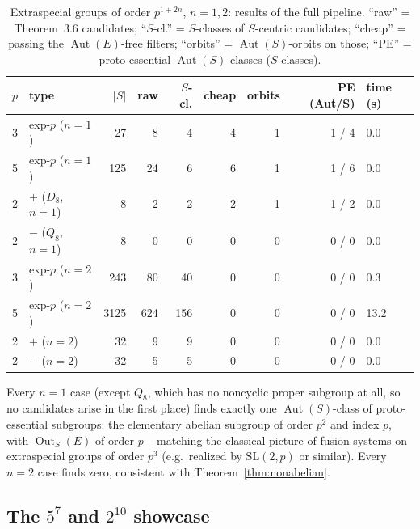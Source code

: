 \documentclass[11pt]{article}
\theoremstyle{remark}
\begin{document}
\begin{table}[htbp]
\centering
\caption{Extraspecial groups of order $p^{1+2n}$, $n=1,2$: results of the
full pipeline. ``raw'' = Theorem~3.6 candidates; ``$S$-cl.'' = $S$-classes
of $S$-centric candidates; ``cheap'' = passing the $\operatorname{Aut}(E)$-free
filters; ``orbits'' = $\operatorname{Aut}(S)$-orbits on those; ``PE'' =
proto-essential $\operatorname{Aut}(S)$-classes ($S$-classes).}
\label{tab:small}
\begin{tabular}{@{}llrrrrrrl@{}}
\toprule
$p$ & type & $|S|$ & raw & $S$-cl. & cheap & orbits & PE (Aut/S) & time (s) \\
\midrule
3 & exp-$p$ ($n=1$) & 27    & 8   & 4   & 4 & 1 & 1 / 4 & 0.0 \\
5 & exp-$p$ ($n=1$) & 125   & 24  & 6   & 6 & 1 & 1 / 6 & 0.0 \\
2 & $+$ ($D_8$, $n=1$)   & 8     & 2   & 2   & 2 & 1 & 1 / 2 & 0.0 \\
2 & $-$ ($Q_8$, $n=1$)   & 8     & 0   & 0   & 0 & 0 & 0 / 0 & 0.0 \\
3 & exp-$p$ ($n=2$) & 243   & 80  & 40  & 0 & 0 & 0 / 0 & 0.3 \\
5 & exp-$p$ ($n=2$) & 3125  & 624 & 156 & 0 & 0 & 0 / 0 & 13.2 \\
2 & $+$ ($n=2$)      & 32    & 9   & 9   & 0 & 0 & 0 / 0 & 0.0 \\
2 & $-$ ($n=2$)      & 32    & 5   & 5   & 0 & 0 & 0 / 0 & 0.0 \\
\bottomrule
\end{tabular}
\end{table}

Every $n=1$ case (except $Q_8$, which has no noncyclic proper subgroup at
all, so no candidates arise in the first place) finds exactly one
$\operatorname{Aut}(S)$-class of proto-essential subgroups: the elementary
abelian subgroup of order $p^2$ and index $p$, with $\operatorname{Out}_S(E)$
of order $p$ -- matching the classical picture of fusion systems on
extraspecial groups of order $p^3$ (e.g.\ realized by $\mathrm{SL}(2,p)$ or
similar). Every $n=2$ case finds zero, consistent with
Theorem~\ref{thm:nonabelian}.

\subsection{The $5^7$ and $2^{10}$ showcase}
\end{document}
